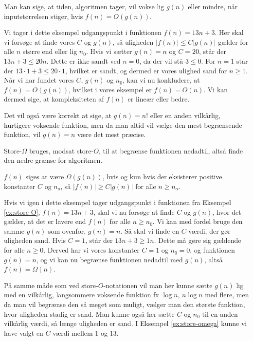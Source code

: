 Man kan sige, at tiden, algoritmen tager, vil vokse lig $g(n)$ eller mindre, når inputstørrelsen stiger, hvis $f(n)=O(g(n))$.

\begin{exmp} \label{ex:store-O}
Vi tager i dette eksempel udgangspunkt i funktionen $f(n)=13n+3$. 
Her skal vi forsøge at finde vores $C$ og $g(n)$, så uligheden $|f(n)| \leq C|g(n)|$ gælder for alle $n$ større end eller lig $n_0$. Hvis vi sætter $g(n) = n$ og $C=20$, står der $13n+3 \leq 20n$. Dette er ikke sandt ved $n=0$, da der vil stå $3 \leq 0$. For $n=1$ står der $13\cdot 1 + 3 \leq 20 \cdot 1$, hvilket er sandt, og dermed er vores ulighed sand for $n \geq 1$.
Når vi har fundet vores $C$, $g(n)$ og $n_0$, kan vi nu konkludere, at $f(n) = O(g(n))$, hvilket i vores eksempel er $f(n) = O(n)$.
Vi kan dermed sige, at kompleksiteten af $f(n)$ er lineær eller bedre.
\end{exmp}
Det vil også være korrekt at sige, at $g(n) =n!$ eller en anden vilkårlig, hurtigere voksende funktion, men da man altid vil vælge den mest begrænsende funktion, vil $g(n)=n$ være det mest præcise. 

Store-$\Omega$ bruges, modsat store-$O$, til at begrænse funktionen nedadtil, altså finde den nedre grænse for algoritmen.
\begin{defn}
$f(n)$ siges at være  $\Omega(g(n))$, hvis og kun hvis der eksisterer positive konstanter $C$ og $n_o$, så $|f(n)| \geq C |g(n)|$ for alle $n \geq n_o$.
\end{defn}

\begin{exmp} \label{ex:store-omega}
Hvis vi igen i dette eksempel tager udgangspunkt i funktionen fra Eksempel \ref{ex:store-O}, $f(n)=13n+3$, skal vi nu forsøge at finde $C$ og $g(n)$, hvor det gælder, at det er lavere end $f(n)$ for alle $n \geq n_0$. 
Vi kan med fordel bruge den samme $g(n)$ som ovenfor, $g(n)=n$. Så skal vi finde en $C$-værdi, der gør uligheden sand. Hvis $C=1$, står der $13n+3 \geq 1n$. Dette må gøre sig gældende for alle $n \geq 0$. Derved har vi vores konstanter $C=1$ og $n_0 = 0$, og funktionen $g(n)=n$, og vi kan nu begrænse funktionen nedadtil med $g(n)$, altså $f(n)=\Omega(n)$.
\end{exmp}

På samme måde som ved store-$O$-notationen vil man her kunne sætte $g(n)$ lig med en vilkårlig, langsommere voksende funktion fx $\log n$, $n \log n$ med flere, men da man vil begrænse den så meget som muligt, vælger man den største funktion, hvor uligheden stadig er sand.
Man kunne også her sætte $C$ og $n_0$ til en anden vilkårlig værdi, så længe uligheden er sand. I Eksempel \ref{ex:store-omega} kunne vi have valgt en $C$-værdi mellem 1 og 13. 


